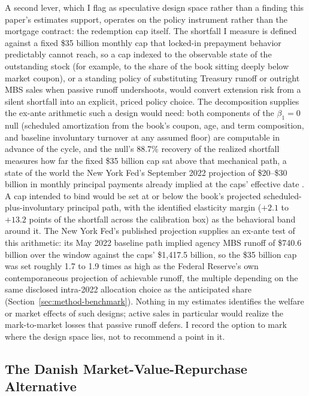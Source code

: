 \documentclass[12pt]{article}
\begin{document}
A second lever, which I flag as speculative design space rather than a finding this paper's estimates support, operates on the policy instrument rather than the mortgage contract: the redemption cap itself. The shortfall I measure is defined against a fixed \$35 billion monthly cap that locked-in prepayment behavior predictably cannot reach, so a cap indexed to the observable state of the outstanding stock (for example, to the share of the book sitting deeply below market coupon), or a standing policy of substituting Treasury runoff or outright MBS sales when passive runoff undershoots, would convert extension risk from a silent shortfall into an explicit, priced policy choice. The decomposition supplies the ex-ante arithmetic such a design would need: both components of the $\beta_1 = 0$ null (scheduled amortization from the book's coupon, age, and term composition, and baseline involuntary turnover at any assumed floor) are computable in advance of the cycle, and the null's 88.7\% recovery of the realized shortfall measures how far the fixed \$35 billion cap sat above that mechanical path, a state of the world the New York Fed's September 2022 projection of \$20--\$30 billion in monthly principal payments already implied at the caps' effective date \citep{nyfed2022}. A cap intended to bind would be set at or below the book's projected scheduled-plus-involuntary principal path, with the identified elasticity margin ($+2.1$ to $+13.2$ points of the shortfall across the calibration box) as the behavioral band around it. The New York Fed's published projection supplies an ex-ante test of this arithmetic: its May 2022 baseline path implied agency MBS runoff of \$740.6 billion over the window against the caps' \$1{,}417.5 billion, so the \$35 billion cap was set roughly 1.7 to 1.9 times as high as the Federal Reserve's own contemporaneous projection of achievable runoff, the multiple depending on the same disclosed intra-2022 allocation choice as the anticipated share (Section~\ref{sec:method-benchmark}). Nothing in my estimates identifies the welfare or market effects of such designs; active sales in particular would realize the mark-to-market losses that passive runoff defers. I record the option to mark where the design space lies, not to recommend a point in it.

\subsection{The Danish Market-Value-Repurchase Alternative}\label{sec:abm-danish}
\end{document}
